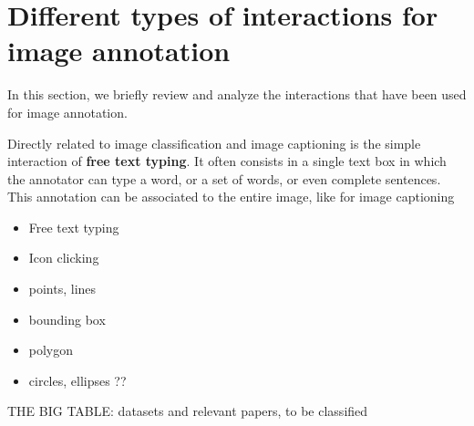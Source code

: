 \section{Different types of interactions for image annotation}%
\label{sec:annotation-types}
In this section, we briefly review and analyze the interactions that have been used for image annotation.

Directly related to image classification and image captioning
is the simple interaction of \textbf{free text typing}.
It often consists in a single text box in which the annotator can type a word,
or a set of words, or even complete sentences.
This annotation can be associated to the entire image, like for image captioning

\begin{itemize}
	\item Free text typing
	\item Icon clicking
	\item points, lines
	\item bounding box
	\item polygon
	\item circles, ellipses ??
\end{itemize}

THE BIG TABLE: datasets and relevant papers, to be classified
